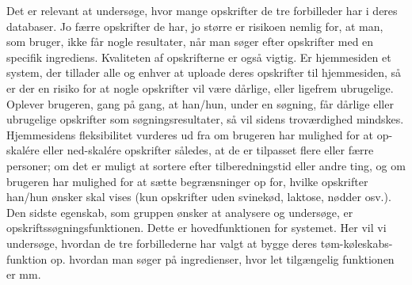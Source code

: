 Det er relevant at undersøge, hvor mange opskrifter de tre forbilleder har i deres databaser. Jo færre opskrifter de har, jo større er risikoen nemlig for, at man, som bruger, ikke får nogle resultater, når man søger efter opskrifter med en specifik ingrediens. Kvaliteten af opskrifterne er også vigtig. Er hjemmesiden \fx et system, der tillader alle og enhver at uploade deres opskrifter til hjemmesiden, så er der en risiko for at nogle opskrifter vil være dårlige, eller ligefrem ubrugelige. Oplever brugeren, gang på gang, at han/hun, under en søgning, får dårlige eller ubrugelige opskrifter som søgningsresultater, så vil sidens troværdighed mindskes. 
Hjemmesidens fleksibilitet vurderes ud fra om brugeren har mulighed for \fx at op-skalére eller ned-skalére opskrifter således, at de er tilpasset flere eller færre personer; om det er muligt at sortere efter tilberedningstid eller andre ting, og om brugeren har mulighed for at sætte begrænsninger op for, hvilke opskrifter han/hun ønsker skal vises (\fx kun opskrifter uden svinekød, laktose, nødder osv.). Den sidste egenskab, som gruppen ønsker at analysere og undersøge, er opskriftssøgningsfunktionen. Dette er hovedfunktionen for systemet. Her vil vi undersøge, hvordan de tre forbillederne har valgt at bygge deres tøm-køleskabs-funktion op. \Fx hvordan man søger på ingredienser, hvor let tilgængelig funktionen er mm.
